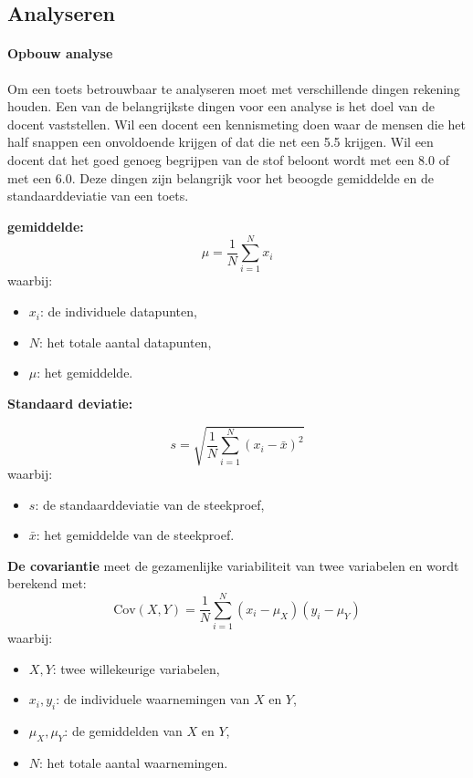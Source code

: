 \documentclass[12pt]{article}
\begin{document}
\subsection{Analyseren}
\begin{multicols}{2}
\paragraph*{Opbouw analyse} Om een toets betrouwbaar te analyseren moet met verschillende dingen rekening houden. Een van de belangrijkste dingen voor een analyse is het doel van de docent vaststellen. Wil een docent een kennismeting doen waar de mensen die het half snappen een onvoldoende krijgen of dat die net een 5.5 krijgen. Wil een docent dat het goed genoeg begrijpen van de stof beloont wordt met een 8.0 of met een 6.0. Deze dingen zijn belangrijk voor het beoogde gemiddelde en de standaarddeviatie van een toets.
\begin{minipage}{1\linewidth}
    
\textbf{gemiddelde: }
\[
\mu = \frac{1}{N} \sum_{i=1}^N x_i
\]
waarbij:
\begin{itemize}
    \item \( x_i \): de individuele datapunten,
    \item \( N \): het totale aantal datapunten,
    \item \( \mu \): het gemiddelde.
\end{itemize}
\end{minipage}
\begin{minipage}{\linewidth}
\textbf{Standaard deviatie: }

\[
s = \sqrt{\frac{1}{N} \sum_{i=1}^N (x_i - \bar{x})^2}
\]
waarbij:
\begin{itemize}
    \item \( s \): de standaarddeviatie van de steekproef,
    \item \( \bar{x} \): het gemiddelde van de steekproef.
\end{itemize}
\end{minipage}
\begin{minipage}{\linewidth}
\textbf{De covariantie} meet de gezamenlijke variabiliteit van twee variabelen en wordt berekend met:
\[
\text{Cov}(X, Y) = \frac{1}{N} \sum_{i=1}^N (x_i - \mu_X)(y_i - \mu_Y)
\]
waarbij:
\begin{itemize}
    \item \(X, Y\): twee willekeurige variabelen,
    \item \(x_i, y_i\): de individuele waarnemingen van \(X\) en \(Y\),
    \item \(\mu_X, \mu_Y\): de gemiddelden van \(X\) en \(Y\),
    \item \(N\): het totale aantal waarnemingen.
\end{itemize}
\end{minipage}
\end{multicols}
\vspace{3em}
\end{document}
